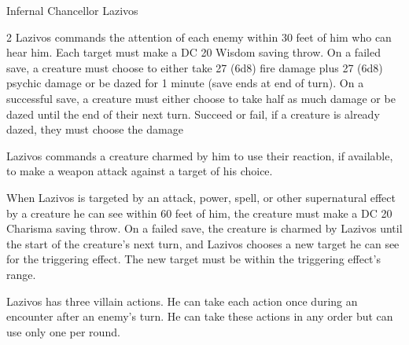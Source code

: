 \documentclass[10pt,a4paper,twoside,bg=print,twocolumn,openany,nodeprecatedcode]{dndbook}
\begin{document}
\begin{DndMonster}[float*=b,width=\textwidth + 8pt]{Infernal Chancellor Lazivos}
\begin{multicols}{2}
Lazivos commands the attention of each enemy within 30 feet of him who can hear him. Each target must make a DC 20 Wisdom saving throw. On a failed save, a creature must choose to either take 27 (6d8) fire damage plus 27 (6d8) psychic damage or be dazed for 1 minute (save ends at end of turn). On a successful save, a creature must either choose to take half as much damage or be dazed until the end of their next turn. Succeed or fail, if a creature is already dazed, they must choose the damage

Lazivos commands a creature charmed by him to use their reaction, if available, to make a weapon attack against a target of his choice.

When Lazivos is targeted by an attack, power, spell, or other supernatural effect by a creature he can see within 60 feet of him, the creature must make a DC 20 Charisma saving throw. On a failed save, the creature is charmed by Lazivos until the start of the creature's next turn, and Lazivos chooses a new target he can see for the triggering effect. The new target must be within the triggering effect's range.

Lazivos has three villain actions. He can take each action once during an encounter after an enemy's turn. He can take these actions in any order but can use only one per round.

\begin{DndMonsterLegendaryActions}
\end{DndMonsterLegendaryActions}
\end{multicols}
\end{DndMonster}
\end{document}
